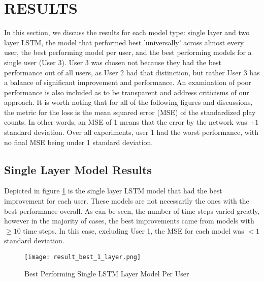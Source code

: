 \section{RESULTS}
	In this section, we discuss the results for each model type: single layer and two layer LSTM, the model that performed best 'universally' across almost every user, the best performing model per user, and the best performing models for a single user (User 3). User 3 was chosen not because they had the best performance out of all users, as User 2 had that distinction, but rather User 3 has a balance of significant improvement and performance. An examination of poor performance is also included as to be transparent and address criticisms of our approach. 
    It is worth noting that for all of the following figures and discussions, the metric for the loss is the mean squared error (MSE) of the standardized play counts. In other words, an MSE of 1 means that the error by the network was $\pm1$ standard deviation. Over all experiments, user 1 had the worst performance, with no final MSE being under 1 standard deviation.
    
	\subsection{Single Layer Model Results}
    Depicted in figure \ref{fig:results-1-layer} is the single layer LSTM model that had the best improvement for each user. These models are not necessarily the ones with the best performance overall. As can be seen, the number of time steps varied greatly, however in the majority of cases, the best improvements came from models with $\geq 10$ time steps. In this case, excluding User 1, the MSE for each model was $<1$ standard deviation.
        \begin{figure}
            \texttt{[image: result\_best\_1\_layer.png]}
            \caption{Best Performing Single LSTM Layer Model Per User}
            \label{fig:results-1-layer}
        \end{figure}
        
